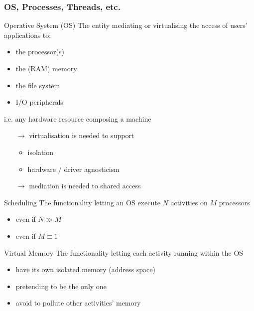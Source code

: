 \documentclass{beamer}\mode<presentation>{\usetheme{AMSBolognaFC}}
\begin{document}
\begin{frame}[allowframebreaks]
    \frametitle{OS, Processes, Threads, etc.}

    \begin{block}{Operative System (OS)}
        The entity mediating or virtualising the access of users' applications to:
        \begin{itemize}
            \item the processor(s)
            \item the (RAM) memory
            \item the file system
            \item I/O peripherals
        \end{itemize}
        i.e. any hardware resource composing a machine
        \begin{itemize}
            \item[$\rightarrow$] virtualisation is needed to support
            \begin{itemize}
                \item isolation
                \item hardware / driver agnosticism
            \end{itemize}
            \item[$\rightarrow$] mediation is needed to shared access
        \end{itemize}
    \end{block}

    \begin{block}{Scheduling}
        The functionality letting an OS execute $N$ activities on $M$ processors
        \begin{itemize}
            \item even if $N \gg M$
            \item even if $M \equiv 1$
        \end{itemize}
    \end{block}

    \begin{block}{Virtual Memory}
        The functionality letting each activity running within the OS
        \begin{itemize}
            \item have its own isolated memory (address space)
            \item pretending to be the only one
            \item avoid to pollute other activities' memory
        \end{itemize}
    \end{block}


\end{frame}
\end{document}
